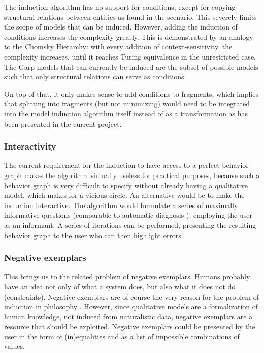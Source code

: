 \documentclass{article} %
\begin{document}
The induction algorithm has no support for conditions, except for
copying structural relations between entities as found in the scenario. This
severely limits the scope of models that can be induced. However, adding the
induction of conditions increases the complexity greatly. This is demonstrated
by an analogy to the Chomsky Hierarchy: with every addition of
context-sensitivity, the complexity increases, until it reaches Turing
equivalence in the unrestricted case. The Garp models that can currently be
induced are the subset of possible models such that only structural relations
can serve as conditions. 

On top of that, it only makes sense to add conditions to fragments, which
implies that splitting into fragments (but not minimizing) would need to be
integrated into the model induction algorithm itself instead of as a
transformation as has been presented in the current project.

\subsubsection{Interactivity}

The current requirement for the induction to have access to a perfect behavior
graph makes the algorithm virtually useless for practical purposes, because
such a behavior graph is very difficult to specify without already having a
qualitative model, which makes for a vicious circle. An alternative would be
to make the induction interactive. The algorithm would formulate a series of
maximally informative questions (comparable to automatic diagnosis
\cite{dekleerdiag}), employing the user as an informant. A series of
iterations can be performed, presenting the resulting behavior graph to the
user who can then highlight errors.

\subsubsection{Negative exemplars}

This brings us to the related problem of negative exemplars. Humans probably
have an idea not only of what a system does, but also what it does not do
(constraints). Negative exemplars are of course the very reason for the
problem of induction in philosophy \cite{hume, popper}.
However, since qualitative models are a formalization of human knowledge, not
induced from naturalistic data, negative exemplars are a resource that should
be exploited. Negative exemplars could be presented by the user in the form of
(in)equalities and as a list of impossible combinations of values.
\end{document}
